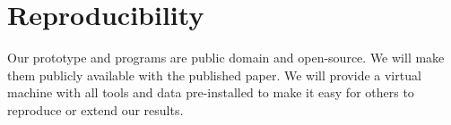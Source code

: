 \section{Reproducibility}
Our \name{} prototype and programs are public domain and open-source. We will make them publicly available with the published paper. We will provide a virtual machine with all tools and data pre-installed to make it easy for others to reproduce or extend our results. 
